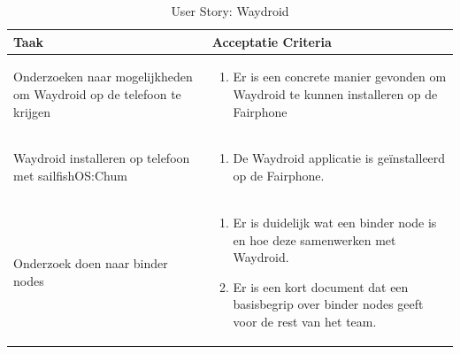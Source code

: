 \documentclass[a4paper]{report}
\newcommand{\userstorycolor}{PeachPuff1}
\begin{document}
\begin{tcolorbox}[colback=white, coltitle=black, colframe=\userstorycolor, title=\textbf{User Story: }Als developer wil ik Waydroid als package kunnen bouwen\, zodat er android apps op de telefoon gerund kunnen worden.]
\begin{table}[H]
    \centering
  \begin{tabularx}{1\textwidth}{|X|X|}
    \hline
    \cellcolor[HTML]{ffcc99} \textbf{Taak} & \cellcolor[HTML]{ffcc99} \textbf{Acceptatie Criteria} \\ 
    \hline
    Onderzoeken naar mogelijkheden om Waydroid op de telefoon te krijgen & 
      \begin{enumerate}
        \item Er is een concrete manier gevonden om Waydroid te kunnen installeren op de Fairphone
      \end{enumerate}
    \\
    \hline
    Waydroid installeren op telefoon met sailfishOS:Chum & 
      \begin{enumerate}
        \item De Waydroid applicatie is geïnstalleerd op de Fairphone.
      \end{enumerate}
    \\
    \hline
    Onderzoek doen naar binder nodes & 
      \begin{enumerate}
        \item Er is duidelijk wat een binder node is en hoe deze samenwerken met Waydroid. 
        \item Er is een kort document dat een basisbegrip over binder nodes geeft voor de rest van het team.
      \end{enumerate}
    \\
    \hline
    
  \end{tabularx}
  \caption{User Story: Waydroid}
\label{table:it5:story_waydroid}
\end{table}
\end{tcolorbox}
\end{document}
